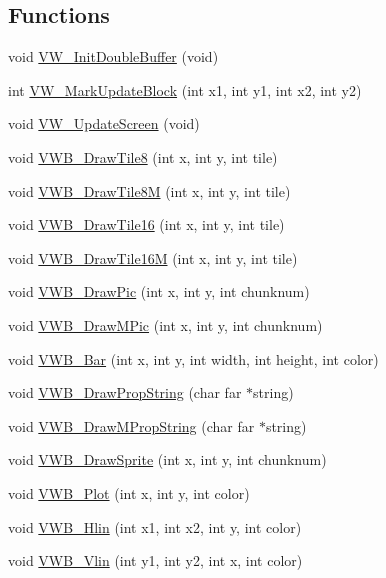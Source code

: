 \subsection*{Functions}
\begin{DoxyCompactItemize}
\item 
void \hyperlink{ID__VH_8H_a8b0d61bb6d6e1e89daf734e2849ca97f}{VW\_\-InitDoubleBuffer} (void)
\item 
int \hyperlink{ID__VH_8H_a989fc2652f729213162c520d378578b3}{VW\_\-MarkUpdateBlock} (int x1, int y1, int x2, int y2)
\item 
void \hyperlink{ID__VH_8H_a0968c2c5350fb70b79df6fdc2733e243}{VW\_\-UpdateScreen} (void)
\item 
void \hyperlink{ID__VH_8H_a7503d2d58d938b13174536e76796c4c2}{VWB\_\-DrawTile8} (int x, int y, int tile)
\item 
void \hyperlink{ID__VH_8H_a1ecd055d301eb59747c8a19756939dfc}{VWB\_\-DrawTile8M} (int x, int y, int tile)
\item 
void \hyperlink{ID__VH_8H_a9d022f350ac0a90deae1b0b11df524db}{VWB\_\-DrawTile16} (int x, int y, int tile)
\item 
void \hyperlink{ID__VH_8H_a40572b92f43f156193263671c3335e62}{VWB\_\-DrawTile16M} (int x, int y, int tile)
\item 
void \hyperlink{ID__VH_8H_a997467dad7e57de584aa100eb9a8c882}{VWB\_\-DrawPic} (int x, int y, int chunknum)
\item 
void \hyperlink{ID__VH_8H_ab588a85d316f6a1e0642243f6bceb0c2}{VWB\_\-DrawMPic} (int x, int y, int chunknum)
\item 
void \hyperlink{ID__VH_8H_a5496b8df6f9a9de1b3f788ce6951c865}{VWB\_\-Bar} (int x, int y, int width, int height, int color)
\item 
void \hyperlink{ID__VH_8H_a8efd746c0d9c5c4e7015b569e4f6bb24}{VWB\_\-DrawPropString} (char far $\ast$string)
\item 
void \hyperlink{ID__VH_8H_a8c9c234ef93cdaa903ba3aa34b3cecb9}{VWB\_\-DrawMPropString} (char far $\ast$string)
\item 
void \hyperlink{ID__VH_8H_aa064e7b05be7a64d115f3e2d790a5615}{VWB\_\-DrawSprite} (int x, int y, int chunknum)
\item 
void \hyperlink{ID__VH_8H_a9ebc1393c381167c87778c7270148f4d}{VWB\_\-Plot} (int x, int y, int color)
\item 
void \hyperlink{ID__VH_8H_a5438374e81536560343d6be41205ecf6}{VWB\_\-Hlin} (int x1, int x2, int y, int color)
\item 
void \hyperlink{ID__VH_8H_adad5945cddefd75d9c787644201b242f}{VWB\_\-Vlin} (int y1, int y2, int x, int color)

\end{DoxyCompactItemize}
